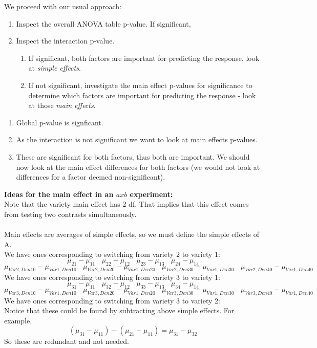 We proceed with our usual approach:
\begin{enumerate}
\item Inspect the overall ANOVA table p-value.  If significant,
\item Inspect the interaction p-value.  
\begin{enumerate}
\item If significant, both factors are important for predicting the response, look at \textit{simple effects}.
\item If not significant, investigate the main effect p-values for significance to determine which factors are important for predicting the response - look at those \textit{main effects}.
\end{enumerate}
\end{enumerate}

\newpage

\begin{enumerate}
\item Global p-value is signficant.
\item As the interaction is not significant we want to look at main effects p-values.
\item These are significant for both factors, thus both are important.  We should now look at the main effect differences for both factors (we would not look at differences for a factor deemed non-significant).\\
\end{enumerate}

\textbf{Ideas for the main effect in an $axb$ experiment:}\\
Note that the variety main effect has 2 df.  That implies that this effect comes from testing two contrasts simultaneously.  \\~\\
Main effects are averages of simple effects, so we must define the simple effects of A.\\ 

We have ones corresponding to switching from variety 2 to variety 1:
$$\mu_{21}-\mu_{11}~~~~\mu_{22}-\mu_{12}~~~~\mu_{23}-\mu_{13}~~~~\mu_{24}-\mu_{14}$$
$$\mu_{Var2,Den10}-\mu_{Var1,Den10}~~~~\mu_{Var2,Den20}-\mu_{Var1,Den20}~~~~\mu_{Var2,Den30}-\mu_{Var1,Den30}~~~~\mu_{Var2,Den40}-\mu_{Var1,Den40}$$
We have ones corresponding to switching from variety 3 to variety 1:
$$\mu_{31}-\mu_{11}~~~~\mu_{32}-\mu_{12}~~~~\mu_{33}-\mu_{13}~~~~\mu_{34}-\mu_{14}$$
$$\mu_{Var3,Den10}-\mu_{Var1,Den10}~~~~\mu_{Var3,Den20}-\mu_{Var1,Den20}~~~~\mu_{Var3,Den30}-\mu_{Var1,Den30}~~~~\mu_{Var3,Den40}-\mu_{Var1,Den40}$$
We have ones corresponding to switching from variety 3 to variety 2:\\
Notice that these could be found by subtracting above simple effects.  For example,
$$(\mu_{31}-\mu_{11})-(\mu_{21}-\mu_{11})=\mu_{31}-\mu_{32}$$
So these are redundant and not needed.\\

